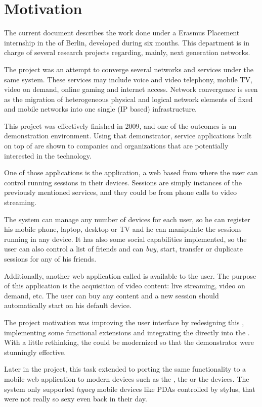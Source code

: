 \section{Motivation} %
\label{sec:motivation}

The current document describes the work done under a Erasmus Placement internship in the  of Berlin, developed during six months.
This department is in charge of several research projects regarding, mainly, next generation networks.

The  project was an attempt to converge several networks and services under the same system.
These services may include voice and video telephony, mobile TV, video on demand, online gaming and internet access.
Network convergence is seen as the migration of heterogeneous physical and logical network elements of fixed and mobile networks into one single (IP based) infrastructure.

This project was effectively finished in 2009, and one of the outcomes is an  demonstration environment.
Using that demonstrator, service applications built on top of  are shown to companies and organizations that are potentially interested in the technology.

One of those applications is the  application, a web based  from where the user can control running sessions in their devices.
Sessions are simply instances of the previously mentioned services, and they could be from phone calls to video streaming.

The system can manage any number of devices for each user, so he can register his mobile phone, laptop, desktop or TV and he can manipulate the sessions running in any device.
It has also some social capabilities implemented, so the user can also control a list of friends and can \emph{buy}, start, transfer or duplicate sessions for any of his friends.

Additionally, another web application called  is available to the user.
The purpose of this application is the acquisition of video content: live streaming, video on demand, etc.
The user can buy any content and a new session should automatically start on his default device.

The project motivation was improving the user interface by redesigning this , implementing some functional extensions and integrating the  directly into the .
With a little rethinking, the  could be modernized so that the demonstrator were stunningly effective.

Later in the project, this task extended to porting the same functionality to a mobile web application to modern devices such as the , the  or the  devices.
The system only supported \emph{legacy} mobile devices like PDAs controlled by stylus, that were not really so sexy even back in their day.
